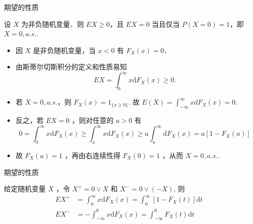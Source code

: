 \documentclass[Prob-All.tex]{subfiles}
\begin{document}
\begin{frame}{期望的性质}
\begin{thm}
设 $X$ 为非负随机变量．则 $E X \geqslant 0$，且 $E X=0$ 当且仅当 $P(X=0)=1$，即 $X=0, a.s..$
\end{thm}

\zheng

\begin{itemize}[<+-|alert@+>]
\item 因 $X$ 是非负随机变量，当 $x<0$ 有 $F_{X}(x)=0$．
\item 由斯蒂尔切斯积分的定义和性质易知
\[
E X=\int_{0}^{\infty} x \mathrm{d} F_{X}(x) \geqslant 0.
\]
\item 若 $X=0,  a.s.$，则 $F_{X}(x)=1_{\{x \geqslant 0\}}$. 故 $E(X)=\int_{-\infty}^{\infty}xdF_X(x)=0$. %
\item 反之，若 $E X=0$ ，则对任意的 $a>0$ 有
\[
0=\int_{0}^{\infty} x \mathrm{d} F_{X}(x) \geqslant \int_{a}^{\infty} x \mathrm{d} F_{X}(x) \geqslant a \int_{a}^{\infty} \mathrm{d} F_{X}(x)=a\left[1-F_{X}(a)\right]
\]
\item 故 $F_{X}(a)=1$ ，再由右连续性得 $F_{X}(0)=1$ ，从而 $X=0, a.s..$
\end{itemize}





\end{frame}

\begin{frame}{期望的性质}
\begin{thm}
给定随机变量 $X$ ，令 $X^{+}=0 \vee X$ 和 $X^{-}=0 \vee(-X)$, 则
{\small \begin{align*}
E X^{+}&=\int_{0}^{\infty} x \mathrm{d} F_{X}(x)=\int_{0}^{\infty}\left[1-F_{X}(t)\right] \mathrm{d} t\\
E X^{-}&=-\int_{-\infty}^{0} x \mathrm{d} F_{X}(x)=\int_{-\infty}^{0} F_{X}(t) \mathrm{d} t
\end{align*}}

\end{thm}



\end{frame}
\end{document}
